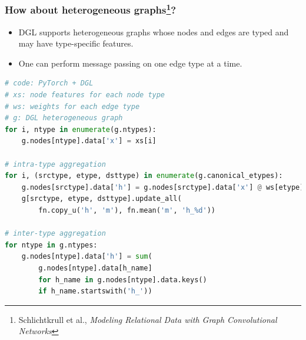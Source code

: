 \documentclass[10pt,aspectratio=169]{beamer}
\begin{document}
	\begin{frame}[fragile]
		\frametitle{How about heterogeneous graphs\footnote{Schlichtkrull et al., \emph{Modeling Relational Data with Graph Convolutional Networks}}?}
		\begin{itemize}
			\item DGL supports heterogeneous graphs whose nodes and edges are typed and may have type-specific features.
			\item One can perform message passing on one edge type at a time.
		\end{itemize}
		\begin{center}
			\centering
			\begin{minipage}{0.7\textwidth}
\begin{lstlisting}[language=Python]
# code: PyTorch + DGL
# xs: node features for each node type
# ws: weights for each edge type
# g: DGL heterogeneous graph
for i, ntype in enumerate(g.ntypes):
    g.nodes[ntype].data['x'] = xs[i]

# intra-type aggregation
for i, (srctype, etype, dsttype) in enumerate(g.canonical_etypes):
    g.nodes[srctype].data['h'] = g.nodes[srctype].data['x'] @ ws[etype]
    g[srctype, etype, dsttype].update_all(
        fn.copy_u('h', 'm'), fn.mean('m', 'h_%d'))

# inter-type aggregation
for ntype in g.ntypes:
    g.nodes[ntype].data['h'] = sum(
        g.nodes[ntype].data[h_name]
        for h_name in g.nodes[ntype].data.keys()
        if h_name.startswith('h_'))
\end{lstlisting}
			\end{minipage}
		\end{center}
	\end{frame}
\end{document}
